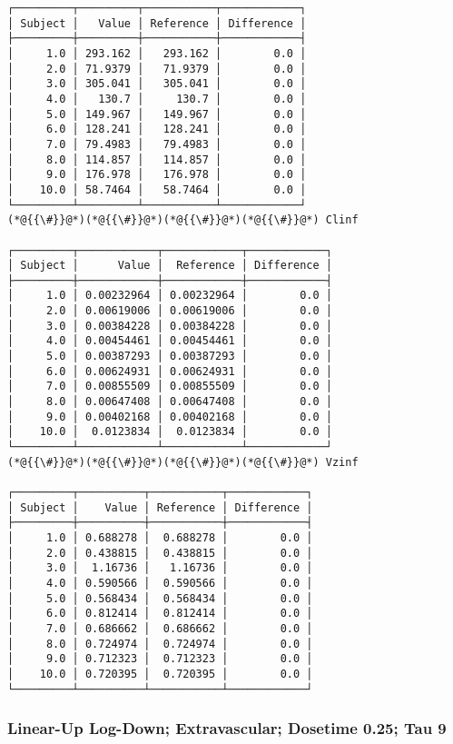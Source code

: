 \documentclass[12pt,a4paper]{article}
\begin{document}
\begin{lstlisting}
┌─────────┬─────────┬───────────┬────────────┐
│ Subject │   Value │ Reference │ Difference │
├─────────┼─────────┼───────────┼────────────┤
│     1.0 │ 293.162 │   293.162 │        0.0 │
│     2.0 │ 71.9379 │   71.9379 │        0.0 │
│     3.0 │ 305.041 │   305.041 │        0.0 │
│     4.0 │   130.7 │     130.7 │        0.0 │
│     5.0 │ 149.967 │   149.967 │        0.0 │
│     6.0 │ 128.241 │   128.241 │        0.0 │
│     7.0 │ 79.4983 │   79.4983 │        0.0 │
│     8.0 │ 114.857 │   114.857 │        0.0 │
│     9.0 │ 176.978 │   176.978 │        0.0 │
│    10.0 │ 58.7464 │   58.7464 │        0.0 │
└─────────┴─────────┴───────────┴────────────┘
(*@{{\#}}@*)(*@{{\#}}@*)(*@{{\#}}@*)(*@{{\#}}@*) Clinf

┌─────────┬────────────┬────────────┬────────────┐
│ Subject │      Value │  Reference │ Difference │
├─────────┼────────────┼────────────┼────────────┤
│     1.0 │ 0.00232964 │ 0.00232964 │        0.0 │
│     2.0 │ 0.00619006 │ 0.00619006 │        0.0 │
│     3.0 │ 0.00384228 │ 0.00384228 │        0.0 │
│     4.0 │ 0.00454461 │ 0.00454461 │        0.0 │
│     5.0 │ 0.00387293 │ 0.00387293 │        0.0 │
│     6.0 │ 0.00624931 │ 0.00624931 │        0.0 │
│     7.0 │ 0.00855509 │ 0.00855509 │        0.0 │
│     8.0 │ 0.00647408 │ 0.00647408 │        0.0 │
│     9.0 │ 0.00402168 │ 0.00402168 │        0.0 │
│    10.0 │  0.0123834 │  0.0123834 │        0.0 │
└─────────┴────────────┴────────────┴────────────┘
(*@{{\#}}@*)(*@{{\#}}@*)(*@{{\#}}@*)(*@{{\#}}@*) Vzinf

┌─────────┬──────────┬───────────┬────────────┐
│ Subject │    Value │ Reference │ Difference │
├─────────┼──────────┼───────────┼────────────┤
│     1.0 │ 0.688278 │  0.688278 │        0.0 │
│     2.0 │ 0.438815 │  0.438815 │        0.0 │
│     3.0 │  1.16736 │   1.16736 │        0.0 │
│     4.0 │ 0.590566 │  0.590566 │        0.0 │
│     5.0 │ 0.568434 │  0.568434 │        0.0 │
│     6.0 │ 0.812414 │  0.812414 │        0.0 │
│     7.0 │ 0.686662 │  0.686662 │        0.0 │
│     8.0 │ 0.724974 │  0.724974 │        0.0 │
│     9.0 │ 0.712323 │  0.712323 │        0.0 │
│    10.0 │ 0.720395 │  0.720395 │        0.0 │
└─────────┴──────────┴───────────┴────────────┘
\end{lstlisting}


\subsubsection{Linear-Up Log-Down; Extravascular; Dosetime 0.25; Tau 9}
\end{document}

